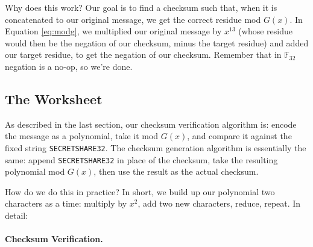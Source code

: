 \documentclass[letterpaper]{article}
\theoremstyle{xxx}
\theoremstyle{evil}
\theoremstyle{yyy}
\theoremstyle{plain}
\theoremstyle{zzz}
\newcommand{\fttwo}{\mathbb{F}_{32}}
\newcommand{\vc}[1]{\texttt{#1}} %
\begin{document}
Why does this work? Our goal is to find a checksum such that, when it is concatenated
to our original message, we get the correct residue mod $G(x)$. In Equation \eqref{eq:modg},
we multiplied our original message by $x^{13}$ (whose residue would then be the negation
of our checksum, minus the target residue) and added our target residue, to get the
negation of our checksum. Remember that in $\fttwo$ negation is a no-op, so we're done.

\subsection{The Worksheet}

As described in the last section, our checksum verification algorithm is: encode the
message as a polynomial, take it mod $G(x)$, and compare it against the fixed string
\vc{SECRETSHARE32}. The checksum generation algorithm is essentially the same:
append \vc{SECRETSHARE32} in place of the checksum, take the resulting polynomial
mod $G(x)$, then use the result as the actual checksum.

How do we do this in practice? In short, we build up our polynomial two characters
as a time: multiply by $x^2$, add two new characters, reduce, repeat. In detail:

\paragraph{Checksum Verification.}
\end{document}

